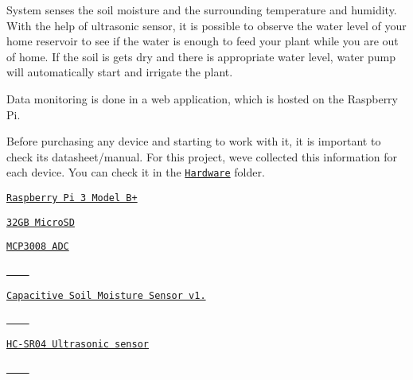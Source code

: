 System senses the soil moisture and the surrounding temperature and humidity. With the help of ultrasonic sensor, it is possible to observe the water level of your home reservoir to see if the water is enough to feed your plant while you are out of home. If the soil is gets dry and there is appropriate water level, water pump will automatically start and irrigate the plant.

Data monitoring is done in a web application, which is hosted on the Raspberry Pi.

Before purchasing any device and starting to work with it, it is important to check its datasheet/manual. For this project, we\textquotesingle{}ve collected this information for each device. You can check it in the \href{https://github.com/atuatohu/Plant-o-Matic/tree/main/Materials/Hardware}{\tt Hardware} folder.


\begin{DoxyItemize}
\item \href{https://www.raspberrypi.org/products/raspberry-pi-3-model-b-plus/}{\tt Raspberry Pi 3 Model B+}
\item \href{https://www.amazon.co.uk/SanDisk-microSDHC-Adapter-Performance-SDSQUA4-032G-GN6MA/dp/B08GY9NYRM/ref=sr_1_3?dchild=1&keywords=micro+sd&qid=1618756194&sr=8-3}{\tt 32\+GB Micro\+SD}
\item \href{https://thepihut.com/products/adafruit-mcp3008-8-channel-10-bit-adc-with-spi-interface}{\tt M\+C\+P3008 A\+DC}
\end{DoxyItemize}

\href{https://thepihut.com/products/adafruit-mcp3008-8-channel-10-bit-adc-with-spi-interface}{\tt ~~~ }


\begin{DoxyItemize}
\item \href{https://thepihut.com/products/capacitive-soil-moisture-sensor}{\tt Capacitive Soil Moisture Sensor v1.}
\end{DoxyItemize}

\href{https://thepihut.com/products/capacitive-soil-moisture-sensor}{\tt ~~~ }


\begin{DoxyItemize}
\item \href{https://thepihut.com/products/ultrasonic-distance-sensor-hcsr04}{\tt H\+C-\/\+S\+R04 Ultrasonic sensor}
\end{DoxyItemize}

\href{https://thepihut.com/products/ultrasonic-distance-sensor-hcsr04}{\tt ~~~ }


